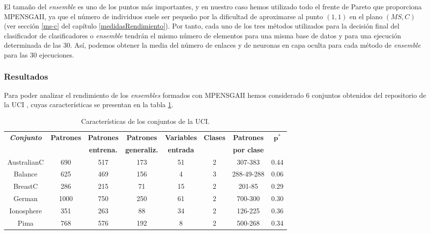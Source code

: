 El tamaño del \textit{ensemble} es uno de los puntos más importantes, y en nuestro caso
hemos utilizado todo el frente de Pareto que proporciona MPENSGAII, ya que el número
de individuos suele ser pequeño por la dificultad de aproximarse al punto $(1,1)$ en el
plano $(MS,C)$ (ver sección \ref{ms-c} del capítulo
\ref{medidasRendimiento}). Por tanto, cada uno de los tres métodos utilizados para la
decisión final del clasificador de clasificadores o \textit{ensemble} tendrán el mismo
número de elementos para una misma base de datos y para una ejecución determinada de las
30. Así, podemos obtener la media del número de enlaces y de neuronas en capa oculta para
cada método de \textit{ensemble} para las 30 ejecuciones.

\subsubsection{Resultados}
\noindent Para poder analizar el rendimiento de los \textit{ensembles} formados con
MPENSGAII hemos considerado 6 conjuntos obtenidos del repositorio de la UCI
\cite{UCI2007}, cuyas características se presentan en la tabla \ref{tabla1Ensembles}.

\begin{table}[htb]
\small
\tabcolsep 2pt
\caption{Características de los conjuntos de la UCI.}
\label{tabla1Ensembles}
\centering
\begin{tabular}{cccccccc}
\hline
\rowcolor[rgb]{0.70,0.85,1}\textit{\textbf{Conjunto}} & \textbf{Patrones} &
\textbf{Patrones} & \textbf{Patrones} & \textbf{Variables} & \textbf{Clases} &
\textbf{Patrones} & $\mathbf{p^*}$ \\
\rowcolor[rgb]{0.70,0.85,1}& & \textbf{entrena.} & \textbf{generaliz.} & \textbf{entrada}
&  & \textbf{por clase} &\\ \hline
\rowcolor[rgb]{0.86,0.94,1}AustralianC & 690 & 517 & 173 & 51 & 2 & 307-383 & 0.44 \\
\rowcolor[rgb]{0.86,0.94,1}Balance & 625 & 469 & 156 & 4 & 3 & 288-49-288 & 0.06 \\
\rowcolor[rgb]{0.86,0.94,1}BreastC & 286 & 215 & 71 & 15 & 2 & 201-85 & 0.29 \\
\rowcolor[rgb]{0.86,0.94,1}German & 1000 & 750 & 250 & 61 & 2 & 700-300 & 0.30 \\
\rowcolor[rgb]{0.86,0.94,1}Ionosphere & 351 & 263 & 88 & 34 & 2 & 126-225 & 0.36 \\
\rowcolor[rgb]{0.86,0.94,1}Pima & 768 & 576 & 192 & 8 & 2 & 500-268 & 0.34 \\ \hline
\end{tabular}
\end{table}

